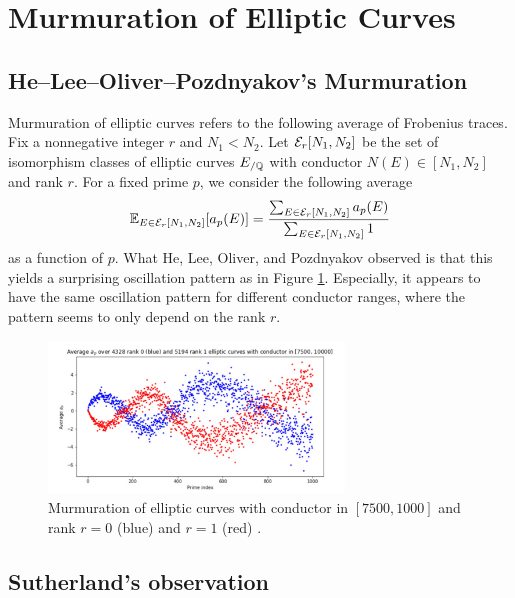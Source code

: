 \section{Murmuration of Elliptic Curves}
\label{sec:elliptic}

\subsection{He--Lee--Oliver--Pozdnyakov's Murmuration}
\label{subsec:elliptic_hlop}

Murmuration of elliptic curves refers to the following average of Frobenius traces.
Fix a nonnegative integer $r$ and $N_1 < N_2$.
Let $\mathcal{E}_r[N_1, N_2]$ be the set of isomorphism classes of elliptic curves $E_{/\mathbb{Q}}$ with conductor $N(E) \in [N_1, N_2]$ and rank $r$.
For a fixed prime $p$, we consider the following average
\begin{equation}
    \mathbb{E}_{E \in \mathcal{E}_r[N_1, N_2]} [a_p(E)] = \frac{\sum_{E \in \mathcal{E}_r[N_1, N_2]} a_p(E)}{\sum_{E \in \mathcal{E}_r[N_1, N_2]} 1}
\end{equation}
as a function of $p$.
What He, Lee, Oliver, and Pozdnyakov \cite{he2024murmurations} observed is that this yields a surprising oscillation pattern as in Figure \ref{fig:hlop}.
Especially, it appears to have the same oscillation pattern for different conductor ranges, where the pattern seems to only depend on the rank $r$.

\begin{figure}[htp] 
\centering
    \includegraphics[width=0.7\textwidth]{src/hlop.png}%
    \caption{Murmuration of elliptic curves with conductor in $[7500, 1000]$ and rank $r = 0$ (blue) and $r = 1$ (red) \cite{he2024murmurations}.}
\label{fig:hlop}
\end{figure}


\subsection{Sutherland's observation}
\label{subsec:elliptic_sutherland}

